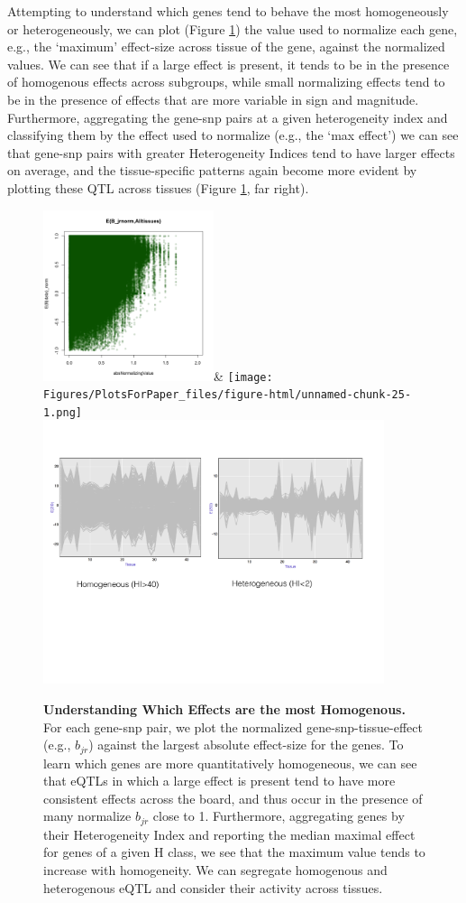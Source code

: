 Attempting to understand which genes tend to behave the most homogeneously or heterogeneously, we can plot (Figure \ref{fig:biplot}) the value used to normalize each gene, e.g., the `maximum' effect-size across tissue of the gene, against the normalized values. We can see that if a large effect is present, it tends to be in the presence of homogenous effects across subgroups, while small normalizing effects tend to be in the presence of effects that are more variable in sign and magnitude. Furthermore, aggregating the gene-snp pairs at a given heterogeneity index and classifying them by the effect used to normalize (e.g., the `max effect') we can see that gene-snp pairs with greater Heterogeneity Indices tend to have larger effects on average, and the tissue-specific patterns again become more evident by plotting these QTL across tissues (Figure \ref{fig:biplot}, far right).
\begin{figure}[htbp]
\includegraphics[width=5cm]{Figures/normstuffeb_alltissues.png}&
\texttt{[image: Figures/PlotsForPaper\_files/figure-html/unnamed-chunk-25-1.png]}\\
\includegraphics[width=10cm]{Figures/hetvshomqtl.pdf}
\caption{\textbf{Understanding Which Effects are the most Homogenous.} For each gene-snp pair, we plot the normalized gene-snp-tissue-effect (e.g., $b_{jr}$) against the largest absolute effect-size for the genes. To learn which genes are more quantitatively homogeneous, we can see that eQTLs in which a large effect is present tend to have more consistent effects across the board, and thus occur in the presence of many normalize $b_{jr}$ close to 1. Furthermore, aggregating genes by their Heterogeneity Index and reporting the median maximal effect for genes of a given H class, we see that the maximum value tends to increase with homogeneity. We can segregate homogenous and heterogenous eQTL and consider their activity across tissues.}
\label{fig:biplot}
\end{figure}

